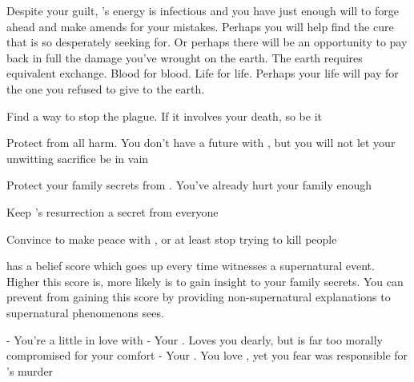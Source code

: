 \documentclass[char]{Pestilence}
\begin{document}
Despite your guilt, \cOutsider{}'s energy is infectious and you have just enough will to forge ahead and make amends for your mistakes. Perhaps you will help find the cure that \cOutsider{} is so desperately seeking for. Or perhaps there will be an opportunity to pay back in full the damage you've wrought on the earth. The earth requires equivalent exchange. Blood for blood. Life for life. Perhaps your life will pay for the one you refused to give to the earth.  

\begin{itemz}[Goals]
	\item Find a way to stop the plague. If it involves your death, so be it
	\item Protect \cOutsider{} from all harm. You don't have a future with \cOutsider{\them}, but you will not let your unwitting sacrifice be in vain
	\item Protect your family secrets from \cOutsider{}. You've already hurt your family enough
	\item Keep \cOutsider{}'s resurrection a secret from everyone
	\item Convince \cApprentice{} to make peace with \cOutsider{}, or at least stop trying to kill people
\end{itemz}

\begin{itemz}[Notes]
	\item \cOutsider{} has a belief score which goes up every time \cOutsider{\they} witnesses a supernatural event. Higher this score is, more likely \cOutsider{\they} is to gain insight to your family secrets. You can prevent \cOutsider{\them} from gaining this score by providing non-supernatural explanations to supernatural phenomenons \cOutsider{\they} sees. 
\end{itemz}

\begin{contacts}
	\contact{\cOutsider{}} - You're a little in love with \cOutsider{\them}
	\contact{\cElder{}} - Your \cElder{\parent}. Loves you dearly, but is far too morally compromised for your comfort
	\contact{\cApprentice{}} - Your \cApprentice{\sibling}. You love \cApprentice{\them}, yet you fear \cApprentice{\they} was responsible for \cOutsider{}'s murder

\end{contacts}
\end{document}
